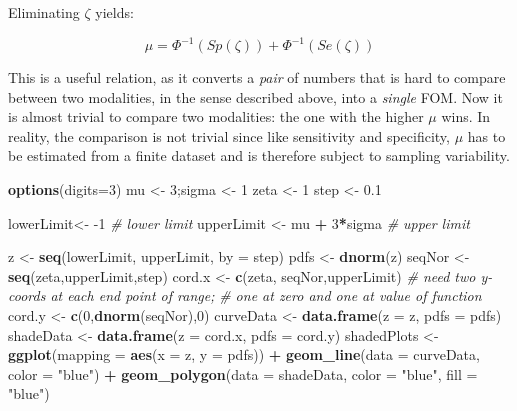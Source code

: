 \documentclass[
]{book}
\newenvironment{Shaded}{\begin{snugshade}}{\end{snugshade}}
\newcommand{\CommentTok}[1]{\textcolor[rgb]{0.56,0.35,0.01}{\textit{#1}}}
\newcommand{\DataTypeTok}[1]{\textcolor[rgb]{0.13,0.29,0.53}{#1}}
\newcommand{\DecValTok}[1]{\textcolor[rgb]{0.00,0.00,0.81}{#1}}
\newcommand{\FloatTok}[1]{\textcolor[rgb]{0.00,0.00,0.81}{#1}}
\newcommand{\KeywordTok}[1]{\textcolor[rgb]{0.13,0.29,0.53}{\textbf{#1}}}
\newcommand{\NormalTok}[1]{#1}
\newcommand{\OperatorTok}[1]{\textcolor[rgb]{0.81,0.36,0.00}{\textbf{#1}}}
\newcommand{\StringTok}[1]{\textcolor[rgb]{0.31,0.60,0.02}{#1}}
\begin{document}
Eliminating \(\zeta\) yields:

\begin{equation} 
\mu = \Phi^{-1} \left (Sp\left ( \zeta \right )  \right ) + \Phi^{-1} \left (Se\left ( \zeta \right )  \right )
\label{eq:binary-task-model-solve-mu}
\end{equation}

This is a useful relation, as it converts a \emph{pair} of numbers that is hard to compare between two modalities, in the sense described above, into a \emph{single} FOM. Now it is almost trivial to compare two modalities: the one with the higher \(\mu\) wins. In reality, the comparison is not trivial since like sensitivity and specificity, \(\mu\) has to be estimated from a finite dataset and is therefore subject to sampling variability.

\begin{Shaded}
\begin{Highlighting}[]
\KeywordTok{options}\NormalTok{(}\DataTypeTok{digits=}\DecValTok{3}\NormalTok{)}
\NormalTok{mu <-}\StringTok{ }\DecValTok{3}\NormalTok{;sigma <-}\StringTok{ }\DecValTok{1}
\NormalTok{zeta <-}\StringTok{ }\DecValTok{1}
\NormalTok{step <-}\StringTok{ }\FloatTok{0.1}

\NormalTok{lowerLimit<-}\StringTok{ }\DecValTok{-1} \CommentTok{# lower limit}
\NormalTok{upperLimit <-}\StringTok{ }\NormalTok{mu }\OperatorTok{+}\StringTok{ }\DecValTok{3}\OperatorTok{*}\NormalTok{sigma }\CommentTok{# upper limit}

\NormalTok{z <-}\StringTok{ }\KeywordTok{seq}\NormalTok{(lowerLimit, upperLimit, }\DataTypeTok{by =}\NormalTok{ step)}
\NormalTok{pdfs <-}\StringTok{ }\KeywordTok{dnorm}\NormalTok{(z)}
\NormalTok{seqNor <-}\StringTok{ }\KeywordTok{seq}\NormalTok{(zeta,upperLimit,step)}
\NormalTok{cord.x <-}\StringTok{ }\KeywordTok{c}\NormalTok{(zeta, seqNor,upperLimit) }
\CommentTok{# need two y-coords at each end point of range; }
\CommentTok{# one at zero and one at value of function}
\NormalTok{cord.y <-}\StringTok{ }\KeywordTok{c}\NormalTok{(}\DecValTok{0}\NormalTok{,}\KeywordTok{dnorm}\NormalTok{(seqNor),}\DecValTok{0}\NormalTok{) }
\NormalTok{curveData <-}\StringTok{ }\KeywordTok{data.frame}\NormalTok{(}\DataTypeTok{z =}\NormalTok{ z, }\DataTypeTok{pdfs =}\NormalTok{ pdfs)}
\NormalTok{shadeData <-}\StringTok{ }\KeywordTok{data.frame}\NormalTok{(}\DataTypeTok{z =}\NormalTok{ cord.x, }\DataTypeTok{pdfs =}\NormalTok{ cord.y)}
\NormalTok{shadedPlots <-}\StringTok{ }\KeywordTok{ggplot}\NormalTok{(}\DataTypeTok{mapping =} \KeywordTok{aes}\NormalTok{(}\DataTypeTok{x =}\NormalTok{ z, }\DataTypeTok{y =}\NormalTok{ pdfs)) }\OperatorTok{+}\StringTok{ }
\StringTok{  }\KeywordTok{geom_line}\NormalTok{(}\DataTypeTok{data =}\NormalTok{ curveData, }\DataTypeTok{color =} \StringTok{"blue"}\NormalTok{) }\OperatorTok{+}\StringTok{ }
\StringTok{  }\KeywordTok{geom_polygon}\NormalTok{(}\DataTypeTok{data =}\NormalTok{ shadeData, }\DataTypeTok{color =} \StringTok{"blue"}\NormalTok{, }\DataTypeTok{fill =} \StringTok{"blue"}\NormalTok{)}


\end{Highlighting}
\end{Shaded}
\end{document}

